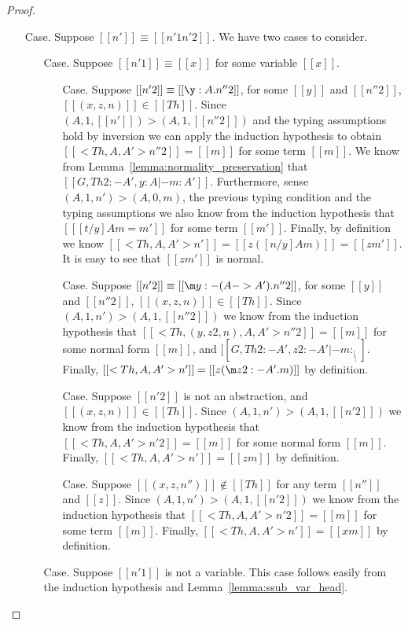 \begin{proof}
\begin{itemize}
  \item[Case.] Suppose $[[n']] \equiv [[n'1 n'2]]$. We have two cases to consider.
    \begin{itemize}
    \item[Case.] Suppose $[[n'1]] \equiv [[x]]$ for some variable $[[x]]$.     
      \begin{itemize}
      \item[Case.] Suppose $[[n'2]] \equiv [[\y:A.n''2]]$, for some $[[y]]$ and $[[n''2]]$,
        $[[(x,z,n)]] \in [[Th]]$. Since 
        $(A,1,[[n']]) > (A,1,[[n''2]])$ and the typing assumptions
        hold by inversion we can apply the induction
        hypothesis to obtain $[[<Th,A,A'>n''2]] = [[m]]$ for some term $[[m]]$.
        We know from Lemma~\ref{lemma:normality_preservation} that 
        $[[G,Th 2:{-A'},y:A |- m : A']]$.
        Furthermore, sense $(A,1,n') > (A,0,m)$, the previous typing condition and
        the typing assumptions we also know from the induction hypothesis that 
        $[[ [t/y] A m = m' ]]$ for some term $[[m']]$. Finally, by definition we know 
        $[[<Th, A, A'>n']] = [[z ([n/y] A m)]] = [[z m']]$.  It is easy to see that
        $[[z m']]$ is normal.      

      \item[Case.] Suppose $[[n'2]] \equiv [[\m y:{-(A->A')}.n''2]]$, for some $[[y]]$ and 
        $[[n''2]]$, $[[(x,z,n)]] \in [[Th]]$. Since $(A,1,n') > (A,1,[[n''2]])$ we know from the 
        induction hypothesis that $[[<Th,(y,z2,n),A,A'>n''2]] = [[m]]$ for some normal form 
        $[[m]]$, and $[[G,Th 2:{-A'},z2:{-A'} |- m : _|_ ]]$.
        Finally, $[[<Th, A,A'>n']] = [[z (\m z2:{-A'}.m)]]$ by definition.

      \item[Case.] Suppose $[[n'2]]$ is not an abstraction, and $[[(x,z,n)]] \in [[Th]]$.  
        Since $(A,1,n') > (A,1,[[n'2]])$ we know from the 
        induction hypothesis that $[[<Th,A,A'>n'2]] = [[m]]$ for some normal form $[[m]]$.  Finally,
        $[[<Th, A,A'>n']] = [[z m]]$ by definition.      

      \item[Case.] Suppose $[[(x,z,n'')]] \not \in [[Th]]$ for any term $[[n'']]$ and $[[z]]$.  
        Since $(A,1,n') > (A,1,[[n'2]])$ we know from the 
        induction hypothesis that $[[<Th,A,A'>n'2]] = [[m]]$ for some term $[[m]]$.  Finally,
        $[[<Th, A,A'>n']] = [[x m]]$ by definition.      
      \end{itemize}
    \item[Case.] Suppose $[[n'1]]$ is not a variable.  This case follows easily from
      the induction hypothesis and Lemma~\ref{lemma:ssub_var_head}.
    \end{itemize}
  \end{itemize}


\end{proof}
